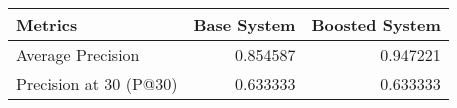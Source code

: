 \begin{tabular}{lrr}
\toprule
               Metrics &  Base System &  Boosted System \\
\midrule
     Average Precision &     0.854587 &        0.947221 \\
Precision at 30 (P@30) &     0.633333 &        0.633333 \\
\bottomrule
\end{tabular}
